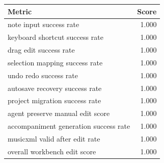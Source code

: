 \begin{tabular}{lr}
\toprule
Metric & Score \\
\midrule
note input success rate & 1.000 \\
keyboard shortcut success rate & 1.000 \\
drag edit success rate & 1.000 \\
selection mapping success rate & 1.000 \\
undo redo success rate & 1.000 \\
autosave recovery success rate & 1.000 \\
project migration success rate & 1.000 \\
agent preserve manual edit score & 1.000 \\
accompaniment generation success rate & 1.000 \\
musicxml valid after edit rate & 1.000 \\
overall workbench edit score & 1.000 \\
\bottomrule
\end{tabular}
